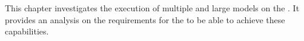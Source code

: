 This chapter investigates the execution of multiple and large models on the \graicore{}.
It provides an analysis on the requirements for the \confignoc{} to be able to achieve these capabilities.